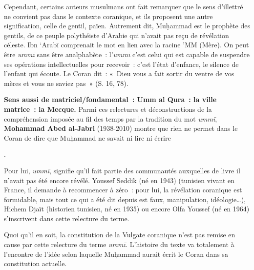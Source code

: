 Cependant, certains auteurs musulmans ont fait remarquer que le sens
d'illettré ne convient pas dans le contexte coranique, et ils proposent
une autre signification, celle de gentil, païen. Autrement dit, Muḥammad
est le prophète des gentils, de ce peuple polythéiste d'Arabie qui
n'avait pas reçu de révélation céleste. Ibn `Arabī comprenait le mot en
lien avec la racine 'MM (Mère). On peut être \emph{ummī} sans être
analphabète~: l'\emph{ummī} c'est celui qui est capable de suspendre ses
opérations intellectuelles pour recevoir~: c'est l'état d'enfance, le
silence de l'enfant qui écoute. Le Coran dit~: «~Dieu vous a fait sortir
du ventre de vos mères et vous ne saviez pas~» (S. 16, 78).

\textbf{{Sens aussi de matriciel/fondamental~: Umm al Qura~: la
ville matrice~: la
Mecque.} 
}
Parmi ces relectures et déconstructions de la compréhension imposée au
fil des temps par la tradition du mot \emph{ummī}, \textbf{Mohammad Abed
al-Jabri} (1938-2010) montre que rien ne permet dans le Coran de dire
que Muḥammad ne savait ni lire ni écrire

. 
  
  Pour lui, \emph{ummī}, signifie qu'il
fait partie des communautés auxquelles de livre il n'avait pas été
encore révélé. Youssef Seddik (né en 1943) (tunisien vivant en France,
il demande à recommencer à zéro~: pour lui, la révélation coranique est
formidable, mais tout ce qui a été dit depuis est faux, manipulation,
idéologie\ldots), Hichem Djaït
(historien tunisien, né en 1935) ou encore Olfa Youssef (né en
1964) 
  s'inscrivent dans cette relecture
du terme.




Quoi qu'il en soit, la constitution de la Vulgate coranique n'est pas
remise en cause par cette relecture du terme \emph{ummī.} L'histoire du
texte va totalement à l'encontre de l'idée selon laquelle Muḥammad
aurait écrit le Coran dans sa constitution actuelle.


